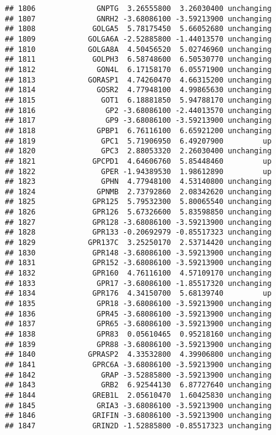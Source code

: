 \documentclass[]{article}
\begin{document}
\begin{verbatim}
## 1806              GNPTG  3.26555800  3.26030400 unchanging
## 1807              GNRH2 -3.68086100 -3.59213900 unchanging
## 1808             GOLGA5  5.78175450  5.66052680 unchanging
## 1809            GOLGA6A -2.52885800 -1.44013570 unchanging
## 1810            GOLGA8A  4.50456520  5.02746960 unchanging
## 1811             GOLPH3  6.58748600  6.50530770 unchanging
## 1812              GON4L  6.17158170  6.05571900 unchanging
## 1813            GORASP1  4.74260470  4.66315200 unchanging
## 1814              GOSR2  4.77948100  4.99865630 unchanging
## 1815               GOT1  6.18881850  5.94788170 unchanging
## 1816                GP2 -3.68086100 -2.44013570 unchanging
## 1817                GP9 -3.68086100 -3.59213900 unchanging
## 1818              GPBP1  6.76116100  6.65921200 unchanging
## 1819               GPC1  5.71906950  6.49207900         up
## 1820               GPC3  2.88053320  2.26030400 unchanging
## 1821             GPCPD1  4.64606760  5.85448460         up
## 1822               GPER -1.94389530  1.98612890         up
## 1823               GPHN  4.77948100  4.53140800 unchanging
## 1824              GPNMB  2.73792860  2.08342620 unchanging
## 1825             GPR125  5.79532300  5.80065540 unchanging
## 1826             GPR126  5.67326600  5.83598850 unchanging
## 1827             GPR128 -3.68086100 -3.59213900 unchanging
## 1828             GPR133 -0.20692979 -0.85517323 unchanging
## 1829            GPR137C  3.25250170  2.53714420 unchanging
## 1830             GPR148 -3.68086100 -3.59213900 unchanging
## 1831             GPR152 -3.68086100 -3.59213900 unchanging
## 1832             GPR160  4.76116100  4.57109170 unchanging
## 1833              GPR17 -3.68086100 -1.85517320 unchanging
## 1834             GPR176  4.34150700  5.68139740         up
## 1835              GPR18 -3.68086100 -3.59213900 unchanging
## 1836              GPR45 -3.68086100 -3.59213900 unchanging
## 1837              GPR65 -3.68086100 -3.59213900 unchanging
## 1838              GPR83  0.05610465  0.95218160 unchanging
## 1839              GPR88 -3.68086100 -3.59213900 unchanging
## 1840            GPRASP2  4.33532800  4.39906800 unchanging
## 1841             GPRC6A -3.68086100 -3.59213900 unchanging
## 1842               GRAP -3.52885800 -3.59213900 unchanging
## 1843               GRB2  6.92544130  6.87727640 unchanging
## 1844             GREB1L  2.05610470  1.60425830 unchanging
## 1845              GRIA3 -3.68086100 -3.59213900 unchanging
## 1846             GRIFIN -3.68086100 -3.59213900 unchanging
## 1847             GRIN2D -1.52885800 -0.85517323 unchanging

\end{verbatim}
\end{document}
